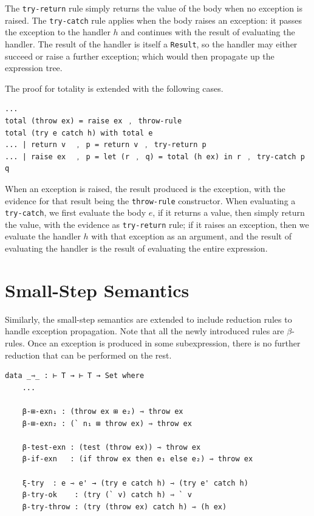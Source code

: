 The \texttt{try-return} rule simply returns the value of the body when no exception is raised.
The \texttt{try-catch} rule applies when the body raises an exception: it passes the exception to the handler $h$ and continues with the result of evaluating the handler.
The result of the handler is itself a \texttt{Result}, so the handler may either succeed or raise a further exception; which would then propagate up the expression tree.

The proof for totality is extended with the following cases.
\begin{verbatim}
...
total (throw ex) = raise ex ﹐ throw-rule
total (try e catch h) with total e
... | return v  ﹐ p = return v ﹐ try-return p
... | raise ex  ﹐ p = let (r ﹐ q) = total (h ex) in r ﹐ try-catch p q
\end{verbatim}

When an exception is raised, the result produced is the exception, with the evidence for that result being the \texttt{throw-rule} constructor.
When evaluating a \texttt{try-catch}, we first evaluate the body $e$, if it returns a value, then simply return the value, with the evidence as \texttt{try-return} rule; if it raises an exception, then we evaluate the handler $h$ with that exception as an argument, and the result of evaluating the handler is the result of evaluating the entire expression.

\section{Small-Step Semantics}

Similarly, the small-step semantics are extended to include reduction rules to handle exception propagation.
Note that all the newly introduced rules are $\beta$-rules. Once an exception is produced in some subexpression, there is no further reduction that can be performed on the rest.
\begin{verbatim}
data _⇾_ : ⊢ T → ⊢ T → Set where
    ...

    β-⊞-exn₁ : (throw ex ⊞ e₂) ⇾ throw ex
    β-⊞-exn₂ : (` n₁ ⊞ throw ex) ⇾ throw ex

    β-test-exn : (test (throw ex)) ⇾ throw ex
    β-if-exn   : (if throw ex then e₁ else e₂) ⇾ throw ex

    ξ-try  : e ⇾ e' → (try e catch h) ⇾ (try e' catch h)
    β-try-ok    : (try (` v) catch h) ⇾ ` v
    β-try-throw : (try (throw ex) catch h) ⇾ (h ex)
\end{verbatim}


